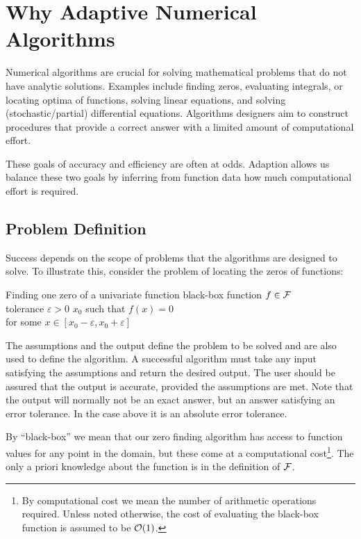 \chapter{Why Adaptive Numerical Algorithms}
Numerical algorithms are crucial for solving mathematical problems that do not have analytic solutions.  Examples include finding zeros, evaluating integrals, or locating optima of functions, solving linear equations, and solving (stochastic/partial) differential equations.  Algorithms designers aim to construct procedures that provide a correct answer with a limited amount of computational effort.  

These goals of accuracy and efficiency are often at odds.  Adaption allows us balance these two goals by inferring from function data how much computational effort is required.

\section{Problem Definition}

Success depends on the scope of problems that the algorithms are designed to solve.  To illustrate this, consider the problem of locating the zeros of functions:
\begin{problem}{Finding one zero of a univariate function}\label{prob:findzero}
%
{black-box function $f \in \mathcal{F}$ \\ tolerance $\varepsilon > 0$ }%
{$x_0$ such that $f(x) = 0$ \\ 
    \qquad for some $x \in [x_0 - \varepsilon, x_0 + \varepsilon]$}
\end{problem}

The assumptions and the output define the problem to be solved and are also used to define the algorithm. A successful algorithm must take any input satisfying the assumptions and return the desired output.   The user should be assured that the output is accurate, provided the assumptions are met.  Note that the output will normally not be an exact answer, but an answer satisfying an error tolerance.  In the case above it is an absolute error tolerance.

By ``black-box'' we mean that our zero finding algorithm has access to function values for any point in the domain, but these come at a computational cost\footnote{By computational cost we mean the number of arithmetic operations required.  Unless noted otherwise, the cost of evaluating the black-box function is assumed to be $\operatorname{{\mathcal O}}(1)$.}. The only a priori knowledge about the function is in the definition of $\mathcal{F}$.

